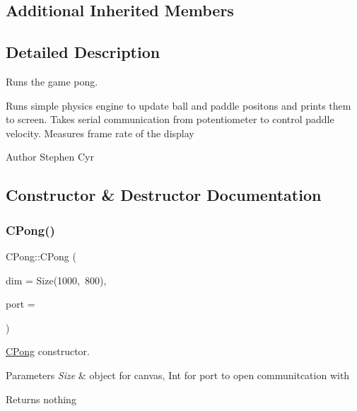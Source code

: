 \subsection*{Additional Inherited Members}


\subsection{Detailed Description}
Runs the game pong. 

Runs simple physics engine to update ball and paddle positons and prints them to screen. Takes serial communication from potentiometer to control paddle velocity. Measures frame rate of the display

\begin{DoxyAuthor}{Author}
Stephen Cyr 
\end{DoxyAuthor}


\subsection{Constructor \& Destructor Documentation}
\hypertarget{class_c_pong_ac118507edc4d9cc2dd1d2f1d9e88fa45}{}\label{class_c_pong_ac118507edc4d9cc2dd1d2f1d9e88fa45} 
\subsubsection{\texorpdfstring{C\+Pong()}{CPong()}}
{\footnotesize\ttfamily C\+Pong\+::\+C\+Pong (\begin{DoxyParamCaption}\item[{Size}]{dim = {\ttfamily Size(1000,~800)},  }\item[{int}]{port = {} }\end{DoxyParamCaption})}



\hyperlink{class_c_pong}{C\+Pong} constructor. 


\begin{DoxyParams}{Parameters}
{\em Size} & object for canvas, Int for port to open communitcation with \\
\hline
\end{DoxyParams}
\begin{DoxyReturn}{Returns}
nothing 
\end{DoxyReturn}
\hypertarget{class_c_pong_aff4c3b1dc98694c7fafe100499e686a1}{}\label{class_c_pong_aff4c3b1dc98694c7fafe100499e686a1} 
